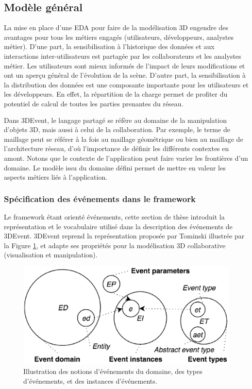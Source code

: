 \subsection{Modèle général}
La mise en place d'une \gls{EDA} pour faire de la modélisation \gls{3D} engendre des 
avantages pour tous les métiers engagés (utilisateurs, développeurs, analystes métier).
D'une part, la sensibilisation à l'historique des données et aux interactions 
inter-utilisateurs est partagée par les collaborateurs et les analystes métier. 
Les utilisateurs sont mieux informés de l'impact de leurs modifications et 
ont un aperçu général de l'évolution de la scène. D'autre part, 
la sensibilisation à la distribution des données est une composante 
importante pour les utilisateurs et les développeurs. En effet, la répartition 
de la charge permet de profiter du potentiel de calcul de toutes les parties 
prenantes du réseau. 

Dans 3DEvent, le langage partagé se réfère au domaine de la manipulation 
d'objets \gls{3D}, mais aussi à celui de la collaboration. Par exemple, le terme 
de 
maillage peut se référer à la fois au maillage géométrique ou bien au maillage de 
l'architecture réseau, d'où l'importance de définir les différents contextes en amont. 
Notons que le contexte de l'application peut faire varier les frontières d'un 
domaine. Le modèle issu du domaine défini permet de mettre en valeur les 
aspects métiers liés à l'application.

\subsubsection{Spécification des événements dans le framework}
Le \gls{framework} étant orienté événements, cette section de thèse introduit la 
représentation et 
le vocabulaire utilisé dans la description des événements de 3DEvent. 3DEvent 
reprend la représentation proposée par Tominski \cite{Doktor-ingenieur2006} 
illustrée par la Figure \ref{fig:representation_event}, et adapte ses propriétés pour 
la modélisation \gls{3D} collaborative (visualisation et manipulation). 

\begin{figure}[ht]
	\centering
	\includegraphics[width=0.7\columnwidth]{eps/event4.eps}
	\caption{Illustration des notions d'événements du domaine, des types 
		d'événements, et des instances d'événements.}
	\label{fig:representation_event}
\end{figure} 

